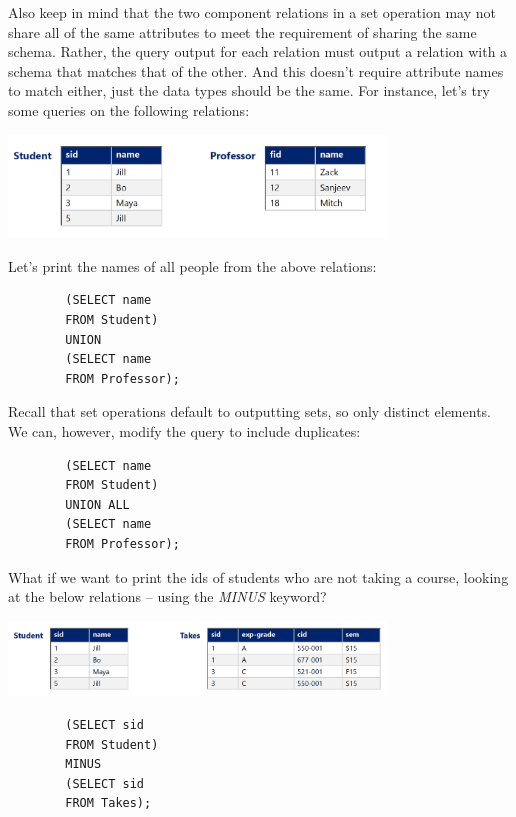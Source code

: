 \documentclass{article}
\begin{document}
Also keep in mind that the two component relations in a set operation may not share all of the same attributes to meet the requirement of sharing the same schema. Rather, the query output for each relation must output a relation with a schema that matches that of the other. And this doesn't require attribute names to match either, just the data types should be the same. For instance, let's try some queries on the following relations:

\includegraphics[width=10cm]{Assets/studentProfExample.png}

Let's print the names of all people from the above relations:

\begin{tcolorbox}
    \begin{verbatim}
        (SELECT name
        FROM Student)
        UNION
        (SELECT name
        FROM Professor);
    \end{verbatim}
\end{tcolorbox}

Recall that set operations default to outputting sets, so only distinct elements. We can, however, modify the query to include duplicates:

\begin{tcolorbox}
    \begin{verbatim}
        (SELECT name
        FROM Student)
        UNION ALL
        (SELECT name
        FROM Professor);
    \end{verbatim}
\end{tcolorbox}

What if we want to print the ids of students who are not taking a course, looking at the below relations -- using the \textit{MINUS} keyword?

\includegraphics[width=10cm]{Assets/studentClassExample.png}

\begin{tcolorbox}
    \begin{verbatim}
        (SELECT sid
        FROM Student)
        MINUS
        (SELECT sid
        FROM Takes);
    \end{verbatim}
\end{tcolorbox}
\end{document}
